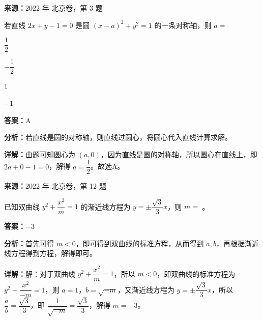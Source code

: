 \begin{question}[points=4]
\textbf{来源：}2022 年 北京卷，第 3 题\par
若直线 $2x + y - 1 = 0$ 是圆 $(x-a)^2 + y^2 = 1$ 的一条对称轴，则 $a =$
\begin{choices}
  \item $\dfrac{1}{2}$
  \item $-\dfrac{1}{2}$
  \item $1$
  \item $-1$
\end{choices}
\begin{solution}
\textbf{答案：}A

\textbf{分析：}若直线是圆的对称轴，则直线过圆心，将圆心代入直线计算求解。

\textbf{详解：}由题可知圆心为 $(a,0)$，因为直线是圆的对称轴，所以圆心在直线上，即 $2a + 0 - 1 = 0$，解得 $a = \dfrac{1}{2}$。故选A。
\end{solution}
\end{question}

\begin{question}[points=5]
\textbf{来源：}2022 年 北京卷，第 12 题\par
已知双曲线 $y^2 + \dfrac{x^2}{m} = 1$ 的渐近线方程为 $y = \pm \dfrac{\sqrt{3}}{3} x$，则 $m =$ 。
\fillin[{$-3$}]
\begin{solution}
\textbf{答案：}$-3$

\textbf{分析：}首先可得 $m<0$，即可得到双曲线的标准方程，从而得到 $a,b$，再根据渐近线方程得到方程，解得即可。

\textbf{详解：}解：对于双曲线 $y^2 + \dfrac{x^2}{m} = 1$，所以 $m<0$，即双曲线的标准方程为 $y^2 - \dfrac{x^2}{-m} = 1$，则 $a=1$，$b = \sqrt{-m}$，又渐近线方程为 $y = \pm \dfrac{\sqrt{3}}{3} x$，所以 $\dfrac{a}{b} = \dfrac{\sqrt{3}}{3}$，即 $\dfrac{1}{\sqrt{-m}} = \dfrac{\sqrt{3}}{3}$，解得 $m = -3$。
\end{solution}
\end{question}

